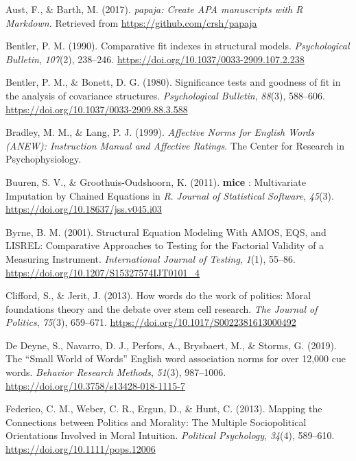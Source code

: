\documentclass[
  man,floatsintext]{apa6}
\newlength{\cslhangindent}
\newenvironment{CSLReferences}[2] %
 {\begin{list}{}{%
  \setlength{\itemindent}{0pt}
  \setlength{\leftmargin}{0pt}
  \setlength{\parsep}{0pt}
  \ifodd #1
   \setlength{\leftmargin}{\cslhangindent}
   \setlength{\itemindent}{-1\cslhangindent}
  \fi
  \setlength{\itemsep}{#2\baselineskip}}}
 {\end{list}}
\begin{document}
\label{refs}
\begin{CSLReferences}{1}{0}
Aust, F., \& Barth, M. (2017). \emph{{papaja: Create APA manuscripts with R Markdown.}} Retrieved from \url{https://github.com/crsh/papaja}

Bentler, P. M. (1990). Comparative fit indexes in structural models. \emph{Psychological Bulletin}, \emph{107}(2), 238--246. \url{https://doi.org/10.1037/0033-2909.107.2.238}

Bentler, P. M., \& Bonett, D. G. (1980). Significance tests and goodness of fit in the analysis of covariance structures. \emph{Psychological Bulletin}, \emph{88}(3), 588--606. \url{https://doi.org/10.1037/0033-2909.88.3.588}

Bradley, M. M., \& Lang, P. J. (1999). \emph{Affective Norms for English Words (ANEW): Instruction Manual and Affective Ratings}. The Center for Research in Psychophysiology.

Buuren, S. V., \& Groothuis-Oudshoorn, K. (2011). {\textbf{mice}} : Multivariate Imputation by Chained Equations in {\emph{R}}. \emph{Journal of Statistical Software}, \emph{45}(3). \url{https://doi.org/10.18637/jss.v045.i03}

Byrne, B. M. (2001). Structural Equation Modeling With AMOS, EQS, and LISREL: Comparative Approaches to Testing for the Factorial Validity of a Measuring Instrument. \emph{International Journal of Testing}, \emph{1}(1), 55--86. \url{https://doi.org/10.1207/S15327574IJT0101_4}

Clifford, S., \& Jerit, J. (2013). How words do the work of politics: Moral foundations theory and the debate over stem cell research. \emph{The Journal of Politics}, \emph{75}(3), 659--671. \url{https://doi.org/10.1017/S0022381613000492}

De Deyne, S., Navarro, D. J., Perfors, A., Brysbaert, M., \& Storms, G. (2019). The {``}Small World of Words{''} English word association norms for over 12,000 cue words. \emph{Behavior Research Methods}, \emph{51}(3), 987--1006. \url{https://doi.org/10.3758/s13428-018-1115-7}

Federico, C. M., Weber, C. R., Ergun, D., \& Hunt, C. (2013). {Mapping the Connections between Politics and Morality: The Multiple Sociopolitical Orientations Involved in Moral Intuition}. \emph{Political Psychology}, \emph{34}(4), 589--610. \url{https://doi.org/10.1111/pops.12006}


\end{CSLReferences}
\end{document}
